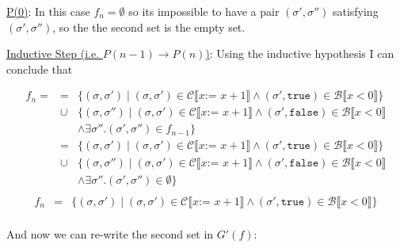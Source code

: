 \documentclass[10pt, oneside]{article}
\begin{document}
\begin{enumerate}[1.]
\begin{enumerate} [(a)]
      \underline{P(0)}: In this case $f_n = \emptyset$ so its impossible to have
      a pair $(\sigma', \sigma'')$ satisfying $(\sigma', \sigma'')$, so the the 
      second set is the empty set.
      
      \underline{Inductive Step (i.e. $P(n - 1) \rightarrow P(n)$)}: Using the 
      inductive hypothesis I can conclude that 
      
      \begin{eqnarray*}
        f_n = & = & \{ (\sigma, \sigma') \mid (\sigma, \sigma') \in \mathcal{C} \llbracket x \texttt{:= } x + 1 \rrbracket \wedge (\sigma', \texttt{true}) \in \mathcal{B} \llbracket x < 0 \rrbracket \}  \\
        & \cup & \{ (\sigma, \sigma'') \mid (\sigma, \sigma')  \in \mathcal{C} \llbracket x \texttt{:= } x + 1 \rrbracket \wedge (\sigma', \texttt{false})\in \mathcal{B} \llbracket x < 0 \rrbracket \\
				& & \wedge \exists \sigma''. (\sigma', \sigma'') \in f_{n-1} \} \\
				& = & \{ (\sigma, \sigma') \mid (\sigma, \sigma') \in \mathcal{C} \llbracket x \texttt{:= } x + 1 \rrbracket \wedge (\sigma', \texttt{true}) \in \mathcal{B} \llbracket x < 0 \rrbracket \}  \\
        & \cup & \{ (\sigma, \sigma'') \mid (\sigma, \sigma')  \in \mathcal{C} \llbracket x \texttt{:= } x + 1 \rrbracket \wedge (\sigma', \texttt{false})\in \mathcal{B} \llbracket x < 0 \rrbracket \\
				& & \wedge \exists \sigma''. (\sigma', \sigma'') \in \emptyset \} \\
			\end{eqnarray*}
			\begin{eqnarray*}
				f_n & = & \{ (\sigma, \sigma') \mid (\sigma, \sigma') \in \mathcal{C} \llbracket x \texttt{:= } x + 1 \rrbracket \wedge (\sigma', \texttt{true}) \in \mathcal{B} \llbracket x < 0 \rrbracket \}  \\
			\end{eqnarray*}
			
			And now we can re-write the second set in $G'(f)$:
			

\end{enumerate}
\end{enumerate}
\end{document}
